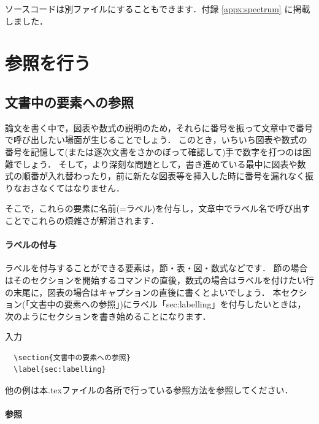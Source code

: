 \documentclass[11pt,a4j,onecolumn]{jsreport} %
\begin{document}
ソースコードは別ファイルにすることもできます．付録 \ref{appx:spectrum} に掲載しました．


\chapter{参照を行う}

\section{文書中の要素への参照}
\label{sec:labelling}

論文を書く中で，図表や数式の説明のため，それらに番号を振って文章中で番号で呼び出したい場面が生じることでしょう．
このとき，いちいち図表や数式の番号を記憶して(または逐次文書をさかのぼって確認して)手で数字を打つのは困難でしょう．
そして，より深刻な問題として，書き進めている最中に図表や数式の順番が入れ替わったり，前に新たな図表等を挿入した時に番号を漏れなく振りなおさなくてはなりません．

そこで，これらの要素に名前(=ラベル)を付与し，文章中でラベル名で呼び出すことでこれらの煩雑さが解消されます．

\subsubsection{ラベルの付与}

ラベルを付与することができる要素は，節・表・図・数式などです．
節の場合はそのセクションを開始するコマンドの直後，数式の場合はラベルを付けたい行の末尾に，図表の場合はキャプションの直後に書くとよいでしょう．
本セクション(「文書中の要素への参照」)にラベル「sec:labelling」を付与したいときは，次のようにセクションを書き始めることになります．

入力
\begin{verbatim}
  \section{文書中の要素への参照}
  \label{sec:labelling}
\end{verbatim}

他の例は本.texファイルの各所で行っている参照方法を参照してください．

\subsubsection{参照}
\end{document}
